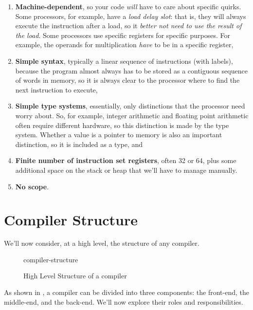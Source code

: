 \begin{enumerate}
    \item \textbf{Machine-dependent}, so your code \emph{will} have to care about specific quirks. Some processors, for example, have a \emph{load delay slot}: that is, they will always execute the instruction after a load, so it \emph{better not need to use the result of the load}. Some processors use specific registers for specific purposes. For example, the operands for multiplication \emph{have} to be in a specific register,
    \item \textbf{Simple syntax}, typically a linear sequence of instructions (with labels), because the program almost always has to be stored as a contiguous sequence of words in memory, so it is always clear to the processor where to find the next instruction to execute,
    \item \textbf{Simple type systems}, essentially, only distinctions that the processor need worry about. So, for example, integer arithmetic and floating point arithmetic often require different hardware, so this distinction is made by the type system. Whether a value is a pointer to memory is also an important distinction, so it is included as a type, and 
    \item \textbf{Finite number of instruction set registers}, often 32 or 64, plus some additional space on the stack or heap that we'll have to manage manually.
    \item \textbf{No scope}.
\end{enumerate}

\section{Compiler Structure}
We'll now consider, at a high level, the structure of any compiler. 

\newcommand{\constructor}[1]{\footnotesize\textbf{\textsf{#1}}}
\newcommand{\terminal}[1]{{\footnotesize\texttt{#1}}}
\newcommand{\annotation}[1]{\scriptsize{\texttt{\textcolor{grey}{#1}}}}

\begin{figure}[h]
    \centering
    {compiler-structure}
    \caption{High Level Structure of a compiler}
    \label{fig:compiler-structure}
\end{figure}

As shown in , a compiler can be divided into three components: the front-end, the middle-end, and the back-end. We'll now explore their roles and responsibilities. 

